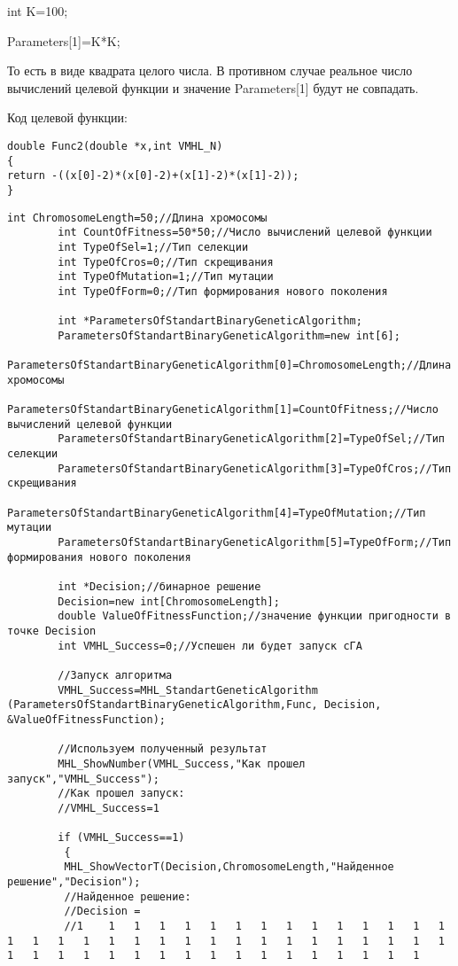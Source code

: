 \documentclass[a4paper,12pt]{article}
\begin{document}
int K=100;

Parameters[1]=K*K;

То есть в виде квадрата целого числа. В противном случае реальное число вычислений целевой функции и значение Parameters[1] будут не совпадать.

Код целевой функции:
\begin{lstlisting}[caption=Оптимизируемая функция]
double Func2(double *x,int VMHL_N)
{
return -((x[0]-2)*(x[0]-2)+(x[1]-2)*(x[1]-2));
}
\end{lstlisting}


\begin{lstlisting}[label=code_use_MHL_StandartGeneticAlgorithm,caption=Пример использования]
        int ChromosomeLength=50;//Длина хромосомы
        int CountOfFitness=50*50;//Число вычислений целевой функции
        int TypeOfSel=1;//Тип селекции
        int TypeOfCros=0;//Тип скрещивания
        int TypeOfMutation=1;//Тип мутации
        int TypeOfForm=0;//Тип формирования нового поколения

        int *ParametersOfStandartBinaryGeneticAlgorithm;
        ParametersOfStandartBinaryGeneticAlgorithm=new int[6];
        ParametersOfStandartBinaryGeneticAlgorithm[0]=ChromosomeLength;//Длина хромосомы
        ParametersOfStandartBinaryGeneticAlgorithm[1]=CountOfFitness;//Число вычислений целевой функции
        ParametersOfStandartBinaryGeneticAlgorithm[2]=TypeOfSel;//Тип селекции
        ParametersOfStandartBinaryGeneticAlgorithm[3]=TypeOfCros;//Тип скрещивания
        ParametersOfStandartBinaryGeneticAlgorithm[4]=TypeOfMutation;//Тип мутации
        ParametersOfStandartBinaryGeneticAlgorithm[5]=TypeOfForm;//Тип формирования нового поколения

        int *Decision;//бинарное решение
        Decision=new int[ChromosomeLength];
        double ValueOfFitnessFunction;//значение функции пригодности в точке Decision
        int VMHL_Success=0;//Успешен ли будет запуск cГА

        //Запуск алгоритма
        VMHL_Success=MHL_StandartGeneticAlgorithm (ParametersOfStandartBinaryGeneticAlgorithm,Func, Decision, &ValueOfFitnessFunction);

        //Используем полученный результат
        MHL_ShowNumber(VMHL_Success,"Как прошел запуск","VMHL_Success");
        //Как прошел запуск:
        //VMHL_Success=1

        if (VMHL_Success==1)
         {
         MHL_ShowVectorT(Decision,ChromosomeLength,"Найденное решение","Decision");
         //Найденное решение:
         //Decision =
         //1	1	1	1	1	1	1	1	1	1	1	1	1	1	1	1	1	1	1	1	1	1	1	1	1	1	1	1	1	1	1	1	1	1	1	1	1	1	1	1	1	1	1	1	1	1	1	1	1	1


\end{lstlisting}
\end{document}
